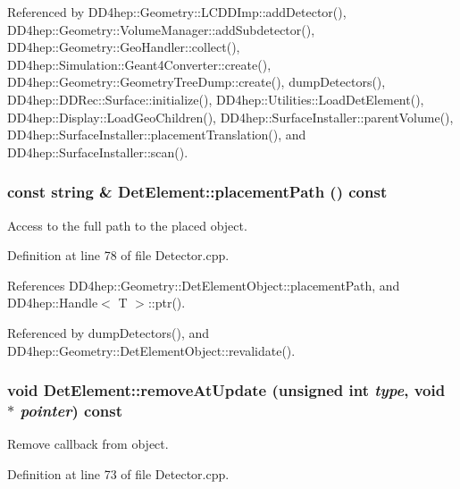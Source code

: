 Referenced by DD4hep::Geometry::LCDDImp::addDetector(), DD4hep::Geometry::VolumeManager::addSubdetector(), DD4hep::Geometry::GeoHandler::collect(), DD4hep::Simulation::Geant4Converter::create(), DD4hep::Geometry::GeometryTreeDump::create(), dumpDetectors(), DD4hep::DDRec::Surface::initialize(), DD4hep::Utilities::LoadDetElement(), DD4hep::Display::LoadGeoChildren(), DD4hep::SurfaceInstaller::parentVolume(), DD4hep::SurfaceInstaller::placementTranslation(), and DD4hep::SurfaceInstaller::scan().\hypertarget{class_d_d4hep_1_1_geometry_1_1_det_element_a0616a56e3d6ac4039041361d533de8ee}{
\subsubsection[{placementPath}]{\setlength{\rightskip}{0pt plus 5cm}const {\bf string} \& DetElement::placementPath () const}}
\label{class_d_d4hep_1_1_geometry_1_1_det_element_a0616a56e3d6ac4039041361d533de8ee}


Access to the full path to the placed object. 

Definition at line 78 of file Detector.cpp.

References DD4hep::Geometry::DetElementObject::placementPath, and DD4hep::Handle$<$ T $>$::ptr().

Referenced by dumpDetectors(), and DD4hep::Geometry::DetElementObject::revalidate().\hypertarget{class_d_d4hep_1_1_geometry_1_1_det_element_acb4a6a5c092ea6e4c4d9bfa781a7eea8}{
\subsubsection[{removeAtUpdate}]{\setlength{\rightskip}{0pt plus 5cm}void DetElement::removeAtUpdate (unsigned int {\em type}, \/  void $\ast$ {\em pointer}) const}}
\label{class_d_d4hep_1_1_geometry_1_1_det_element_acb4a6a5c092ea6e4c4d9bfa781a7eea8}


Remove callback from object. 

Definition at line 73 of file Detector.cpp.

